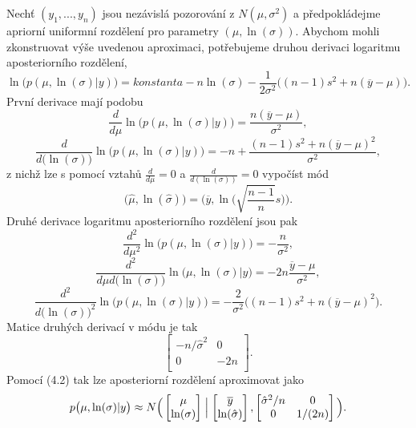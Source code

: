 Nechť $(y_1,..., y_n)$ jsou nezávislá pozorování z $N(\mu, \sigma^2)$ a předpokládejme apriorní uniformní rozdělení pro parametry $(\mu, \ln(\sigma))$. Abychom mohli zkonstruovat výše uvedenou aproximaci, potřebujeme druhou derivaci logaritmu aposteriorního rozdělení,
\begin{equation}
\ln\big(p(\mu, \ln(\sigma)|y)\big) = \textit{konstanta} - n \ln(\sigma) - \frac{1}{2 \sigma^2}\big((n - 1)s^2 + n(\overline{y} - \mu)\big).
\end{equation}
První derivace mají podobu
\begin{equation}
\frac{d}{d \mu} \ln\big(p(\mu, \ln(\sigma)|y)\big) = \frac{n(\overline{y} - \mu)}{\sigma^2},
\end{equation}
\begin{equation}
\frac{d}{d\big(\ln(\sigma)\big)} \ln\big(p(\mu, \ln(\sigma)|y)\big) = -n + \frac{(n - 1)s^2 + n(\overline{y} - \mu)^2}{\sigma^2},
\end{equation}
z nichž lze s pomocí vztahů $\frac{d}{d \mu} = 0$ a $\frac{d}{d(\ln(\sigma))} = 0$ vypočíst mód
\begin{equation}
\big(\hat{\mu}, \ln(\hat{\sigma})\big) = \Big(\overline{y}, \ln\Big(\sqrt{\frac{n - 1}{n}}s\Big)\Big).
\end{equation}
Druhé derivace logaritmu aposteriorního rozdělení jsou pak
\begin{equation}
\frac{d^2}{d \mu^2} \ln\big(p(\mu, \ln(\sigma)|y)\big) = - \frac{n}{\sigma^2},
\end{equation}
\begin{equation}
\frac{d^2}{d \mu d\big(\ln(\sigma)\big)} \ln\big(\mu, \ln(\sigma)|y\big) = -2n \frac{\overline{y} - \mu}{\sigma^2},
\end{equation}
\begin{equation}
\frac{d^2}{d\big(\ln(\sigma)\big)^2}\ln\big(p(\mu, \ln(\sigma)|y)\big) = -\frac{2}{\sigma^2}\big((n - 1)s^2 + n(\overline{y} - \mu)^2 \big).
\end{equation}
Matice druhých derivací v módu je tak
\begin{equation}
\begin{bmatrix}
-n / \hat{\sigma}^2 & 0\\
0 & -2n\\
\end{bmatrix}.
\end{equation}
Pomocí (4.2) tak lze aposteriorní rozdělení aproximovat jako
\begin{equation}
p\big(\mu, \ln(\sigma)|y \big) \approx N \Big(\begin{bmatrix}\mu \\ \ln(\sigma) \end{bmatrix} \Bigm| \begin{bmatrix}\overline{y} \\ \ln(\hat{\sigma}) \end{bmatrix},  \begin{bmatrix}\hat{\sigma}^2 / n & 0\\ 0 & 1 / (2n) \end{bmatrix}\Big).
\end{equation}

